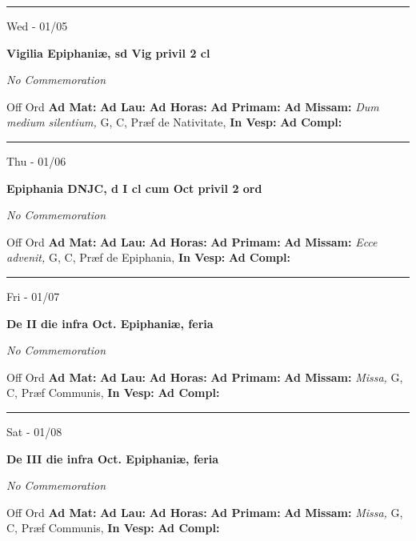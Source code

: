 \documentclass[letterpaper, 10pt]{article}
\begin{document}
\hrule
\begin{center}
Wed - 01/05
\end{center}\textbf{ \large Vigilia Epiphaniæ, \textnormal{\normalsize sd Vig privil 2 cl}}

\textit{No Commemoration}\begin{justify}
Off Ord
\textbf{Ad Mat: }
\textbf{Ad Lau: }
\textbf{Ad Horas: }
\textbf{Ad Primam: }
\textbf{Ad Missam:} \textit{Dum medium silentium, } G, C, Præf de Nativitate, 
\textbf{In Vesp: }
\textbf{Ad Compl: }\end{justify}



\hrule
\begin{center}
Thu - 01/06
\end{center}\textbf{ \large Epiphania DNJC, \textnormal{\normalsize d I cl cum Oct privil 2 ord}}

\textit{No Commemoration}\begin{justify}
Off Ord
\textbf{Ad Mat: }
\textbf{Ad Lau: }
\textbf{Ad Horas: }
\textbf{Ad Primam: }
\textbf{Ad Missam:} \textit{Ecce advenit, } G, C, Præf de Epiphania, 
\textbf{In Vesp: }
\textbf{Ad Compl: }\end{justify}



\hrule
\begin{center}
Fri - 01/07
\end{center}\textbf{ \large De II die infra Oct. Epiphaniæ, \textnormal{\normalsize feria}}

\textit{No Commemoration}\begin{justify}
Off Ord
\textbf{Ad Mat: }
\textbf{Ad Lau: }
\textbf{Ad Horas: }
\textbf{Ad Primam: }
\textbf{Ad Missam:} \textit{Missa, } G, C, Præf Communis, 
\textbf{In Vesp: }
\textbf{Ad Compl: }\end{justify}



\hrule
\begin{center}
Sat - 01/08
\end{center}\textbf{ \large De III die infra Oct. Epiphaniæ, \textnormal{\normalsize feria}}

\textit{No Commemoration}\begin{justify}
Off Ord
\textbf{Ad Mat: }
\textbf{Ad Lau: }
\textbf{Ad Horas: }
\textbf{Ad Primam: }
\textbf{Ad Missam:} \textit{Missa, } G, C, Præf Communis, 
\textbf{In Vesp: }
\textbf{Ad Compl: }\end{justify}
\end{document}
